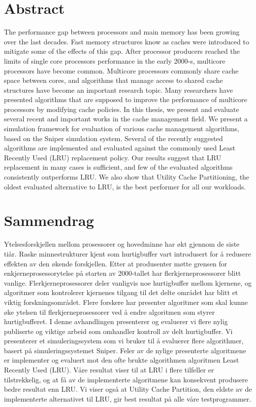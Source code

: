 
\section*{Abstract}

The performance gap between processors and main memory has been growing over the last decades.
Fast memory structures know as caches were introduced to mitigate some of the effects of this gap.
After processor producers reached the limits of single core processors performance in the early 2000-s, multicore processors have become common.
Multicore processors commonly share cache space between cores, and algorithms that manage access to shared cache structures have become an important research topic.
Many researchers have presented algorithms that are supposed to improve the performance of multicore processors by modifying cache policies.
In this thesis, we present and evaluate several recent and important works in the cache management field.
We present a simulation framework for evaluation of various cache management algorithms, based on the Sniper simulation system.
Several of the recently suggested algorithms are implemented and evaluated against the commonly used Least Recently Used (LRU) replacement policy.
Our results suggest that LRU replacement in many cases is sufficient, and few of the evaluated algorithms consistently outperforms LRU.
We also show that Utility Cache Partitioning, the oldest evaluated alternative to LRU, is the best performer for all our workloads.

\clearpage

\section*{Sammendrag}
Ytelsesforskjellen mellom prosessorer og hovedminne har økt gjennom de siste tiår.
Raske minnestrukturer kjent som hurtigbuffer vart introdusert for å redusere effekten av den økende forskjellen.
Etter at produsenter møtte grensen for enkjerneprosessorytelse på starten av 2000-tallet har flerkjerneprosessorer blitt vanlige.
Flerkjerneprosessorer deler vanligvis noe hurtigbuffer mellom kjernene, og algoritmer som kontrolerer kjernenes tilgang til det delte området har blitt et viktig forskningsområdet.
Flere forskere har presenter algoritmer som skal kunne øke ytelsen til flerkjerneprosessorer ved å endre algoritmen som styrer hurtigbufferet.
I denne avhandlingen presenterer og evaluerer vi flere nylig publiserte og viktige arbeid som omhandler kontroll av delt hurtigbuffer.
Vi presenterer et simuleringssystem som vi bruker til å evaluerer flere algorithmer, basert på simuleringssystemet Sniper.
Feler av de nylige presenterte algoritmene er implementer og evaluert mot den ofte brukte algorithmen algoritmen Least Recently Used (LRU).
Våre resultat viser til at LRU i flere tilfeller er tilstrekkelig, og at få av de implementerte algoritmene kan konsekvent produsere bedre resultat enn LRU.
Vi viser også at Utility Cache Partition, den eldste av de implementerte alternativet til LRU, gir best resultat på alle våre testprogrammer.

\clearpage
